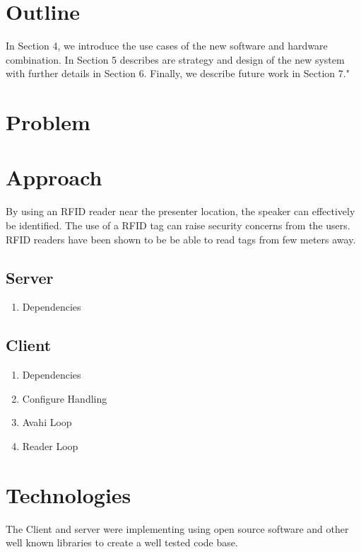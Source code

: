 \documentclass{article}
\begin{document}
\section{Outline}
	  In Section 4, we introduce the use cases of the new software and hardware combination. In Section 5 describes are strategy and design of the new system with further details in Section 6. Finally, we describe future work in Section 7."
\section{Problem}

\section{Approach}
	By using an RFID reader near the presenter location, the speaker can effectively be identified. The use of a RFID tag can raise security concerns
	from the users. RFID readers have been shown to be be able to read tags from few meters away.
	\subsection{Server}
	
	\begin{enumerate}
		
		\item	Dependencies
	\end{enumerate}
	
	\subsection{Client}
	
		\begin{enumerate}
		
			\item	Dependencies
			
				
			\item	Configure Handling
				
			\item	Avahi Loop
				
			\item	Reader Loop
		
		\end{enumerate}


\section{Technologies}
	The Client and server were implementing using open source software and other well known libraries to create a well tested code base.
\end{document}

